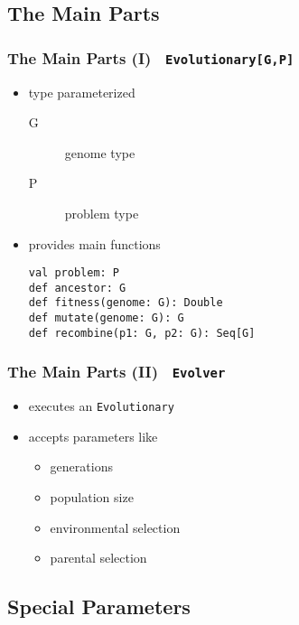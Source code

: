 \documentclass[compress,xcolor=table]{beamer}
\begin{document}
\subsection{The Main Parts}

\begin{frame}
  \frametitle{The Main Parts (I) \textendash\ \texttt{Evolutionary[G,P]}}
  \begin{itemize}
    \item type parameterized
      \begin{description}
        \item[G] genome type
        \item[P] problem type
      \end{description}
    \item provides main functions
      \begin{description}
        \item[\texttt{val problem: P}]
        \item[\texttt{def ancestor: G}]
        \item[\texttt{def fitness(genome: G): Double}]
        \item[\texttt{def mutate(genome: G): G}]
        \item[\texttt{def recombine(p1: G, p2: G): Seq[G]}]
      \end{description}
  \end{itemize}
\end{frame}

\begin{frame}
  \frametitle{The Main Parts (II) \textendash\ \texttt{Evolver}}
  \begin{itemize}
    \item executes an \texttt{Evolutionary}
    \item accepts parameters like
    \begin{itemize}
      \item generations
      \item population size
      \item environmental selection
      \item parental selection
    \end{itemize}
  \end{itemize}
\end{frame}

\subsection{Special Parameters}
\end{document}
